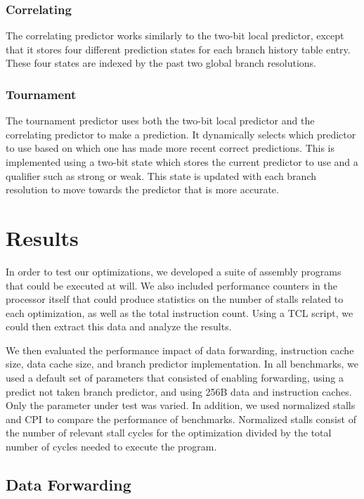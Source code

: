 \documentclass[conference,hidelinks]{IEEEtran}
\begin{document}
\subsubsection{Correlating}

The correlating predictor works similarly to the two-bit local predictor, except that it stores four different prediction states for each branch history table entry. These four states are indexed by the past two global branch resolutions.

\subsubsection{Tournament}

The tournament predictor uses both the two-bit local predictor and the correlating predictor to make a prediction. It dynamically selects which predictor to use based on which one has made more recent correct predictions. This is implemented using a two-bit state which stores the current predictor to use and a qualifier such as strong or weak. This state is updated with each branch resolution to move towards the predictor that is more accurate.

\section{Results}

In order to test our optimizations, we developed a suite of assembly programs that could be executed at will. We also included performance counters in the processor itself that could produce statistics on the number of stalls related to each optimization, as well as the total instruction count. Using a TCL script, we could then extract this data and analyze the results.

We then evaluated the performance impact of data forwarding, instruction cache size, data cache size, and branch predictor implementation. In all benchmarks, we used a default set of parameters that consisted of enabling forwarding, using a predict not taken branch predictor, and using 256B data and instruction caches. Only the parameter under test was varied. In addition, we used normalized stalls and CPI to compare the performance of benchmarks. Normalized stalls consist of the number of relevant stall cycles for the optimization divided by the total number of cycles needed to execute the program.

\subsection{Data Forwarding}
\end{document}
